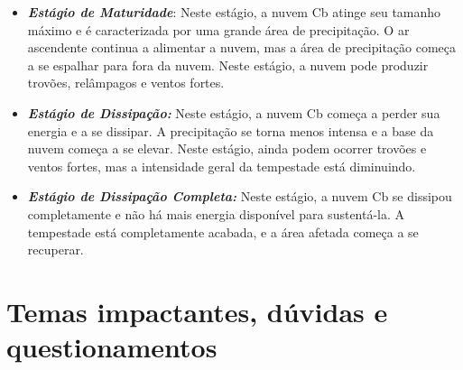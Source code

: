 \documentclass[a4paper, 12pt, onecolumn,singlespacing]{article}
\begin{document}
\begin{itemize}
\begin{itemize}
			\item \textbf{\textit{Estágio de Maturidade}}: Neste estágio, a nuvem Cb atinge seu tamanho máximo e é caracterizada por uma grande área de precipitação. O ar ascendente continua a alimentar a nuvem, mas a área de precipitação começa a se espalhar para fora da nuvem. Neste estágio, a nuvem pode produzir trovões, relâmpagos e ventos fortes.
			
			\item \textbf{\textit{Estágio de Dissipação:}} Neste estágio, a nuvem Cb começa a perder sua energia e a se dissipar. A precipitação se torna menos intensa e a base da nuvem começa a se elevar. Neste estágio, ainda podem ocorrer trovões e ventos fortes, mas a intensidade geral da tempestade está diminuindo.
			
			\item \textbf{\textit{Estágio de Dissipação Completa:}} Neste estágio, a nuvem Cb se dissipou completamente e não há mais energia disponível para sustentá-la. A tempestade está completamente acabada, e a área afetada começa a se recuperar.
		\end{itemize}
	
	\end{itemize}
	\section{Temas impactantes, dúvidas e questionamentos}
	
\end{document}
